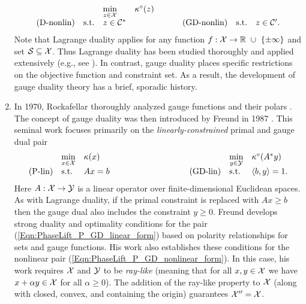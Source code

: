 \begin{enumerate}
\begin{equation}
\begin{array}{lllllll}
			&
				&	\min\limits_{\substack{z \in {\mathcal X}}}
					&	\kappa^\circ(z)
						\\
\textnormal{(D-nonlin)}
	&	\textnormal{s.t.}
		&z \in {\mathcal C}^*
			&	\hspace{2cm} 	\textnormal{(GD-nonlin)}
				&	\textnormal{s.t.}
					&	z \in {\mathcal C}'.
\end{array}
\end{equation}
Note that Lagrange duality applies for any function $f : {\mathcal X} \rightarrow {\mathbb R} \ \cup \ \{\pm \infty\}$ and set ${\mathcal S} \subseteq {\mathcal X}$.  Thus Lagrange duality has been studied thoroughly and applied extensively (e.g., see \cite[Chapter 5]{boyd2004convex}).  In contrast, gauge duality places specific restrictions on the objective function and constraint set.  As a result,  the development of gauge duality theory has a brief, sporadic history.




\item

In 1970, Rockafellar thoroughly analyzed gauge functions and their polars \cite[Part III]{rockafellar1970convex}.  The concept of gauge duality was then introduced by Freund in 1987 \cite{DBLP:journals/mp/Freund87}.  This seminal work focuses primarily on the \textit{linearly-constrained} primal and gauge dual pair
\begin{equation} 			\label{Eqn:PhaseLift_P_GD_linear_form}
\begin{array}{lllllll}
	&	\min\limits_{\substack{x \in \caX}}
		&	\kappa(x)
			&
				&	\min\limits_{\substack{y \in \caY}}
					&	\kappa^\circ(A^*y)
						\\
\textnormal{(P-lin)}
	&	\st
		& 	Ax=b
			&	\hspace{3cm} 	\textnormal{(GD-lin)}
				&	\st
					&	\langle b, y \rangle = 1.
\end{array}
\end{equation}
Here $A : {\mathcal X} \rightarrow {\mathcal Y}$ is a linear operator over finite-dimensional Euclidean spaces. As with Lagrange duality, if the primal constraint is replaced with $Ax \geq b$ then the gauge dual also includes the constraint $y \geq 0$.  Freund develops strong duality and optimality conditions for the pair (\ref{Eqn:PhaseLift_P_GD_linear_form}) based on polarity relationships for sets and gauge functions.  His work also establishes these conditions for the nonlinear pair (\ref{Eqn:PhaseLift_P_GD_nonlinear_form}).  In this case, his work requires ${\mathcal X}$ and ${\mathcal Y}$ to be \textit{ray-like} (meaning that for all $x, y \in {\mathcal X}$ we have $x + \alpha y \in {\mathcal X}$ for all $\alpha \geq 0$).  The addition of the ray-like property to ${\mathcal X}$ (along with closed, convex, and containing the origin) guarantees ${\mathcal X}'' = {\mathcal X}$.



\end{enumerate}

